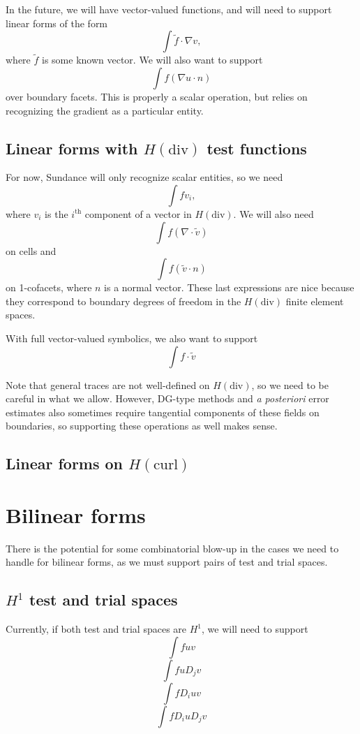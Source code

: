 \documentclass{article}
\begin{document}
In the future, we will have vector-valued
functions, and will need to support linear forms of the form
\[
\int \tilde{f} \cdot \nabla v,
\]
where \( \tilde{f} \) is some known vector.  We will also want to
support
\[
\int f (\nabla u \cdot n)
\]
over boundary facets.  This is properly a scalar operation, but relies
on recognizing the gradient as a particular entity.


\subsection{Linear forms with \( H(\mathrm{div}) \) test functions}
For now, Sundance will only recognize scalar entities, so we need 
\[
\int f v_i,
\]
where \( v_i \) is the \(i^\mathrm{th}\) component of a vector in \(
H(\mathrm{div}) \).  We will also need
\[
\int f ( \nabla \cdot \tilde{v} )
\]
on cells and
\[
\int f (\tilde{v} \cdot n)
\]
on 1-cofacets, where \( n \) is a normal vector.  These last
expressions are nice because they correspond to boundary degrees of
freedom in the \( H(\mathrm{div}) \) finite element spaces.

With full vector-valued symbolics, we also want to support
\[
\int f \cdot \tilde{v}
\]

Note that general traces are not well-defined on \( H(\mathrm{div}) \),
so we need to be careful in what we allow.  However, DG-type methods
and \emph{a posteriori} error estimates also sometimes require
tangential components of these fields on boundaries, so supporting
these operations as well makes sense.

\subsection{Linear forms on \(H(\mathrm{curl})\)}


\section{Bilinear forms}
There is the potential for some combinatorial blow-up in the cases we
need to handle for bilinear forms, as we must support pairs of test and trial
spaces.  

\subsection{\( H^1 \) test and trial spaces}
Currently, if both test and trial spaces are \( H^1 \), we
will need to support 
\[
\int f u v
\]
\[
\int f u D_j v
\]
\[
\int f D_i u v
\]
\[
\int f D_i u D_j v
\]
\end{document}
